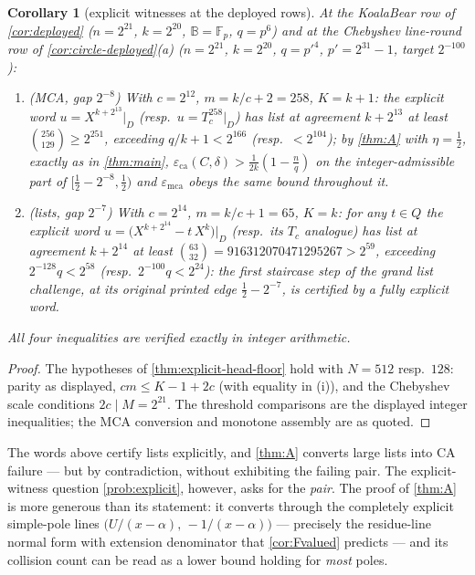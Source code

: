 \documentclass[11pt]{article}
\newtheorem{corollary}[corollary]{Corollary}
\theoremstyle{definition}
\theoremstyle{remark}
\newcommand{\F}{\mathbb{F}}
\newcommand{\B}{\mathbb{B}}
\newcommand{\eca}{\varepsilon_{\mathrm{ca}}}
\newcommand{\emca}{\varepsilon_{\mathrm{mca}}}
\begin{document}
\begin{corollary}[explicit witnesses at the deployed rows]\label{cor:explicit-deployed}
At the KoalaBear row of \cref{cor:deployed} \textup($n=2^{21}$, $k=2^{20}$, $\B=\F_p$, $q=p^6$\textup) and at the Chebyshev line-round row of \cref{cor:circle-deployed}\textup{(a)} \textup($n=2^{21}$, $k=2^{20}$, $q=p'^4$, $p'=2^{31}-1$, target $2^{-100}$\textup):
\begin{enumerate}[label=\textup{(\roman*)}]
\item \textup(MCA, gap $2^{-8}$\textup) With $c=2^{12}$, $m=k/c+2=258$, $K=k+1$: the explicit word $u=X^{k+2^{13}}|_D$ \textup(resp.\ $u=T_c^{258}|_D$\textup) has list at agreement $k+2^{13}$ at least $\binom{256}{129}\ge2^{251}$, exceeding $q/k+1<2^{166}$ \textup(resp.\ $<2^{104}$\textup); by \cref{thm:A} with $\eta=\frac12$, exactly as in \cref{thm:main}, $\eca(C,\delta)>\frac1{2k}(1-\frac nq)$ on the integer-admissible part of $[\frac12-2^{-8},\frac12)$ and $\emca$ obeys the same bound throughout it.
\item \textup(lists, gap $2^{-7}$\textup) With $c=2^{14}$, $m=k/c+1=65$, $K=k$: for any $t\in Q$ the explicit word $u=\bigl(X^{k+2^{14}}-t\,X^{k}\bigr)|_D$ \textup(resp.\ its $T_c$ analogue\textup) has list at agreement $k+2^{14}$ at least $\binom{63}{32}=916312070471295267>2^{59}$, exceeding $2^{-128}q<2^{58}$ \textup(resp.\ $2^{-100}q<2^{24}$\textup): the first staircase step of the grand list challenge, at its original printed edge $\frac12-2^{-7}$, is certified by a fully explicit word.
\end{enumerate}
All four inequalities are verified exactly in integer arithmetic.
\end{corollary}

\begin{proof}
The hypotheses of \cref{thm:explicit-head-floor} hold with $N=512$ resp.\ $128$: parity as displayed, $cm\le K-1+2c$ \textup(with equality in \textup{(i)}\textup), and the Chebyshev scale conditions $2c\mid M=2^{21}$. The threshold comparisons are the displayed integer inequalities; the MCA conversion and monotone assembly are as quoted.
\end{proof}

The words above certify lists explicitly, and \cref{thm:A} converts large lists into CA failure --- but by contradiction, without exhibiting the failing pair.  The explicit-witness question \cref{prob:explicit}, however, asks for the \emph{pair}. The proof of \cref{thm:A} is more generous than its statement: it converts through the completely explicit simple-pole lines $\bigl(U/(x-\alpha),\,-1/(x-\alpha)\bigr)$ --- precisely the residue-line normal form with extension denominator that \cref{cor:Fvalued} predicts --- and its collision count can be read as a lower bound holding for \emph{most} poles.
\end{document}
